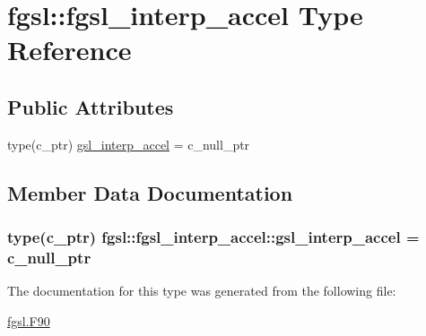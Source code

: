 \hypertarget{structfgsl_1_1fgsl__interp__accel}{\section{fgsl\-:\-:fgsl\-\_\-interp\-\_\-accel Type Reference}
\label{structfgsl_1_1fgsl__interp__accel}
}
\subsection*{Public Attributes}
\begin{DoxyCompactItemize}
\item 
type(c\-\_\-ptr) \hyperlink{structfgsl_1_1fgsl__interp__accel_a702c4cc18edadec004fc9549b03afb32}{gsl\-\_\-interp\-\_\-accel} = c\-\_\-null\-\_\-ptr
\end{DoxyCompactItemize}


\subsection{Member Data Documentation}
\hypertarget{structfgsl_1_1fgsl__interp__accel_a702c4cc18edadec004fc9549b03afb32}{
\subsubsection[{gsl\-\_\-interp\-\_\-accel}]{\setlength{\rightskip}{0pt plus 5cm}type(c\-\_\-ptr) fgsl\-::fgsl\-\_\-interp\-\_\-accel\-::gsl\-\_\-interp\-\_\-accel = c\-\_\-null\-\_\-ptr}}\label{structfgsl_1_1fgsl__interp__accel_a702c4cc18edadec004fc9549b03afb32}


The documentation for this type was generated from the following file\-:\begin{DoxyCompactItemize}
\item 
\hyperlink{fgsl_8F90}{fgsl.\-F90}\end{DoxyCompactItemize}
